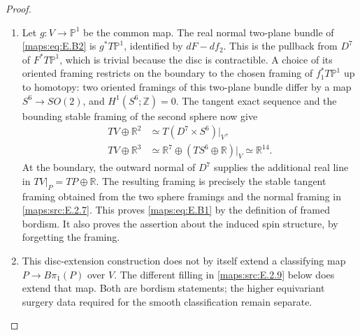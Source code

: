 \begin{proof}
\begin{enumerate}[label=\arabic*.,leftmargin=*]
\item Let $g:V\to\mathbb P^1$ be the common map. The real normal
two-plane bundle of \eqref{maps:eq:E.B2} is $g^*T\mathbb P^1$, identified by
$dF-df_2$. This is the pullback from $D^7$ of $F^*T\mathbb P^1$,
which is trivial because the disc is contractible. A choice of
its oriented framing restricts on the boundary to the chosen
framing of $f_1^*T\mathbb P^1$ up to homotopy: two oriented
framings of this two-plane bundle differ by a map
$S^6\to SO(2)$, and $H^1(S^6;\mathbb Z)=0$.
The tangent exact sequence and the bounding stable framing of
the second sphere now give
\[
 \begin{split}
 TV\oplus\mathbb R^2&\simeq
       T(D^7\times S^6)|_V,\\
 TV\oplus\mathbb R^3&\simeq
       \mathbb R^7\oplus(TS^6\oplus\mathbb R)|_V
       \simeq\mathbb R^{14}.
 \end{split}
\]
At the boundary, the outward normal of $D^7$ supplies the
additional real line in $TV|_P=TP\oplus\mathbb R$.
The resulting framing is precisely the stable tangent framing
obtained from the two sphere framings and the normal framing
in \ref{maps:src:E.2.7}. This proves \eqref{maps:eq:E.B1} by the definition of framed bordism.
It also proves the assertion about the induced spin structure,
by forgetting the framing.

\item This disc-extension construction does not by itself extend a
classifying map $P\to B\pi_1(P)$ over $V$.
The different filling in \ref{maps:src:E.2.9} below does extend that map.
Both are bordism statements; the higher equivariant surgery
data required for the smooth classification remain separate.
\end{enumerate}
\end{proof}


